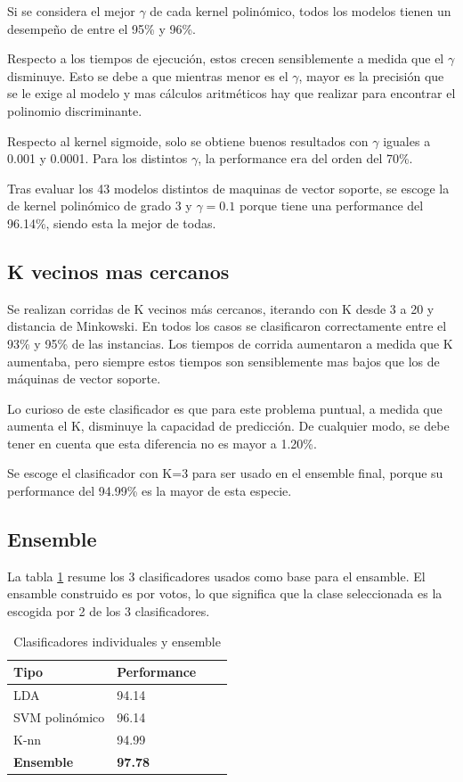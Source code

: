 \documentclass[journal]{IEEEtran}
\begin{document}
Si se considera el mejor $\gamma$ de cada kernel polinómico, todos los modelos tienen un
desempeño de entre el 95\% y 96\%.

Respecto a los tiempos de ejecución, estos crecen sensiblemente a medida que el $\gamma$ 
disminuye. Esto se debe a que mientras menor es el $\gamma$, mayor es la precisión que 
se le exige al modelo y mas cálculos aritméticos hay que realizar para encontrar
el polinomio discriminante. 

Respecto al kernel sigmoide, solo se obtiene buenos resultados con $\gamma$ iguales
a 0.001 y 0.0001. Para los distintos $\gamma$, la performance era del orden del
70\%.

Tras evaluar los 43 modelos distintos de maquinas de vector soporte, se escoge
la de kernel polinómico de grado 3 y $\gamma=0.1$ porque tiene una performance del
96.14\%, siendo esta la mejor de todas.

\subsection{K vecinos mas cercanos}
Se realizan corridas de K vecinos más cercanos, iterando con K desde
3 a 20 y distancia de Minkowski. En todos los casos se clasificaron
correctamente entre el 93\% y 95\% de las instancias. Los tiempos de corrida aumentaron
a medida que K aumentaba, pero siempre estos tiempos son sensiblemente
mas bajos que los de máquinas de vector soporte.

Lo curioso de este clasificador es que para este problema puntual, a medida
que aumenta el K, disminuye la capacidad de predicción. De cualquier modo,
se debe tener en cuenta que esta diferencia no es mayor a 1.20\%.

Se escoge el clasificador con K=3 para ser usado en el ensemble final,
porque su performance del 94.99\% es la mayor de esta especie.

\subsection{Ensemble}
La tabla \ref{table:ensemble_summary} resume los 3 clasificadores usados 
como base para el ensamble. El ensamble construido es por votos, lo que
significa que la clase seleccionada es la escogida por 2 de los
3 clasificadores.

\begin{table}[ht!]
\caption{Clasificadores individuales y ensemble}
\label{table:ensemble_summary}
\centering
\begin{tabular}{l | l l l }
Tipo & Performance  \\
\hline
LDA & 94.14 \\
SVM polinómico & 96.14 \\
K-nn & 94.99 \\
\hline
\textbf{Ensemble} & \textbf{97.78} \\
\end{tabular}
\end{table}
\end{document}
